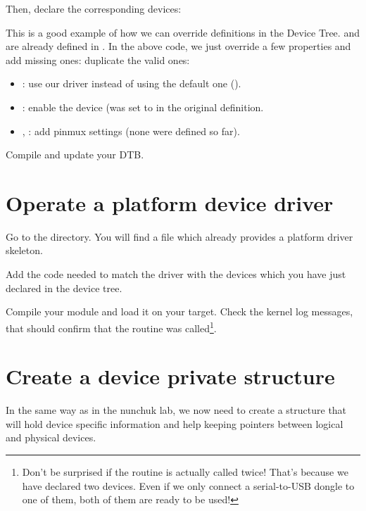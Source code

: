 {\scriptsize {}}

Then, declare the corresponding devices:


This is a good example of how we can override definitions in the Device
Tree.  and  are already defined in
. In the above code, we just
override a few properties and add missing ones:
duplicate the valid ones:

\begin{itemize}
\item {}: use our driver instead of using the default one
      ().
\item {}: enable the device (was set to  in
      the original definition.
\item {}, : add pinmux settings
      (none were defined so far).
\end{itemize}

Compile and update your DTB.

\section{Operate a platform device driver}

Go to the  directory.
You will find a  file which already provides a platform
driver skeleton.

Add the code needed to match the driver with the devices which you have
just declared in the device tree.

Compile your module and load it on your target. Check the kernel log
messages, that should confirm that the  routine was
called\footnote{Don't be surprised if the  routine is
actually called twice! That's because we have declared two devices.
Even if we only connect a serial-to-USB dongle to one of them, both
of them are ready to be used!}.

\section{Create a device private structure}

In the same way as in the nunchuk lab, we now need to create a
structure that will hold device specific information and help
keeping pointers between logical and physical devices.

